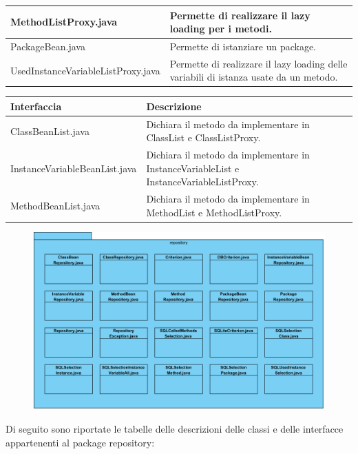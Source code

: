 \documentclass[11pt]{article}
\begin{document}
\begin{description}
\begin{tabular}{|p{}|p{}|}
						\hline
						MethodListProxy.java & Permette di realizzare il lazy loading per i metodi. \\
						\hline
						PackageBean.java & Permette di istanziare un package. \\
						\hline
						UsedInstanceVariableListProxy.java & Permette di realizzare il lazy loading delle variabili di istanza usate da un metodo. \\
						\hline
					\end{tabular}
				\item \begin{tabular}{|p{}|p{}|}
					\hline
					\textbf{Interfaccia} & \textbf{Descrizione}\\
					\hline
					ClassBeanList.java & Dichiara il metodo da implementare in ClassList e ClassListProxy. \\
					\hline
					InstanceVariableBeanList.java &  Dichiara il metodo da implementare in InstanceVariableList e InstanceVariableListProxy. \\
					\hline
					MethodBeanList.java & Dichiara il metodo da implementare in MethodList e MethodListProxy. \\
					\hline
				\end{tabular}
			\newpage
				\item[ 2.1.5.2 Package repository] 
				\item \begin{figure}[!h]
					\centering
					\includegraphics[width=15cm]{diagrams/RepositoryPackageDiagram}
				\end{figure}
				Di seguito sono riportate le tabelle delle descrizioni delle classi e delle interfacce appartenenti al package repository:
				\item \begin{tabular}{|p{}|p{}|}

\end{tabular}
\end{description}
\end{document}
